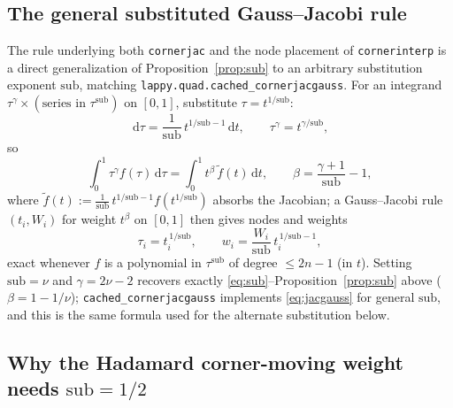 \documentclass[11pt]{article}
\theoremstyle{remark}
\newcommand{\dd}{\,\mathrm{d}}
\newcommand{\code}[1]{\texttt{#1}}
\begin{document}
\subsection{The general substituted Gauss--Jacobi rule}\label{sec:sub3}

The rule underlying both \code{cornerjac} and the node placement of \code{cornerinterp} is a
direct generalization of Proposition~\ref{prop:sub} to an arbitrary substitution exponent
$\mathrm{sub}$, matching \code{lappy.quad.cached\_cornerjacgauss}. For an integrand
$\tau^{\gamma}\times(\text{series in }\tau^{\mathrm{sub}})$ on $[0,1]$, substitute
$\tau=t^{1/\mathrm{sub}}$:
\[
  \dd\tau = \frac1{\mathrm{sub}}\,t^{1/\mathrm{sub}-1}\dd t, \qquad
  \tau^\gamma = t^{\gamma/\mathrm{sub}},
\]
so
\begin{equation}\label{eq:general-sub}
  \int_0^1 \tau^\gamma f(\tau)\dd\tau
  = \int_0^1 t^{\beta}\,\widetilde f(t)\dd t, \qquad
  \beta = \frac{\gamma+1}{\mathrm{sub}} - 1,
\end{equation}
where $\widetilde f(t):=\frac1{\mathrm{sub}}\,t^{1/\mathrm{sub}-1}f(t^{1/\mathrm{sub}})$ absorbs
the Jacobian; a Gauss--Jacobi rule $(t_i,W_i)$ for weight $t^\beta$ on $[0,1]$ then gives nodes
and weights
\begin{equation}\label{eq:jacgauss}
  \tau_i = t_i^{\,1/\mathrm{sub}}, \qquad
  w_i = \frac{W_i}{\mathrm{sub}}\, t_i^{\,1/\mathrm{sub}-1},
\end{equation}
exact whenever $f$ is a polynomial in $\tau^{\mathrm{sub}}$ of degree $\le2n-1$ (in $t$). Setting
$\mathrm{sub}=\nu$ and $\gamma=2\nu-2$ recovers exactly \eqref{eq:sub}--Proposition~\ref{prop:sub}
above ($\beta=1-1/\nu$); \code{cached\_cornerjacgauss} implements \eqref{eq:jacgauss} for general
$\mathrm{sub}$, and this is the same formula used for the alternate substitution below.

\subsection{Why the Hadamard corner-moving weight needs $\mathrm{sub}=1/2$}\label{sec:sub4}
\end{document}
